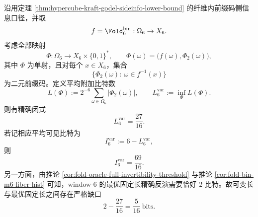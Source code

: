 \begin{theorem}\label{thm:window6-variable-length-exact-inversion-rate-gap}
沿用定理 \ref{thm:hypercube-kraft-godel-sideinfo-lower-bound} 的纤维内前缀码侧信息口径，并取
\[
f=\Fold_6^{\mathrm{bin}}:\Omega_6\to X_6.
\]
考虑全部映射
\[
\Phi:\Omega_6\longrightarrow X_6\times \{0,1\}^\ast,
\qquad
\Phi(\omega)=\bigl(f(\omega),\Phi_2(\omega)\bigr),
\]
其中 \(\Phi\) 为单射，且对每个 \(x\in X_6\)，集合
\[
\{\Phi_2(\omega):\ \omega\in f^{-1}(x)\}
\]
为二元前缀码。定义平均附加比特数
\[
L(\Phi):=2^{-6}\sum_{\omega\in\Omega_6}\bigl|\Phi_2(\omega)\bigr|,
\qquad
L_6^{\mathrm{var}}:=\inf_{\Phi}L(\Phi).
\]
则有精确闭式
\[
\boxed{\;
L_6^{\mathrm{var}}=\frac{27}{16}.\;}
\]
若记相应平均可见比特为
\[
I_6^{\mathrm{var}}:=6-L_6^{\mathrm{var}},
\]
则
\[
\boxed{\;
I_6^{\mathrm{var}}=\frac{69}{16}.\;}
\]
另一方面，由推论 \ref{cor:fold-oracle-full-invertibility-threshold} 与推论 \ref{cor:fold-bin-m6-fiber-hist} 可知，window-\(6\) 的最优固定长精确反演需要恰好 \(2\) 比特。故可变长与最优固定长之间存在严格缺口
\[
\boxed{\;
2-\frac{27}{16}=\frac{5}{16}\ \mathrm{bits}.\;}
\]
\end{theorem}
